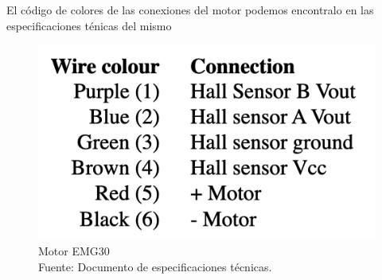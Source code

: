 El código de colores de las conexiones del motor podemos encontralo en las especificaciones ténicas del mismo
\begin{figure}[H]
    \centering
    \includegraphics[scale = 0.6]{part/Proyecto_ejecutivo/memoria_constructiva/motor/img/motorConnection}
    \caption[Motor EMG30]{Motor EMG30 \\Fuente: Documento de especificaciones técnicas.\cite{EMG30datasheet}}\label{fig:motor connection}
\end{figure}

